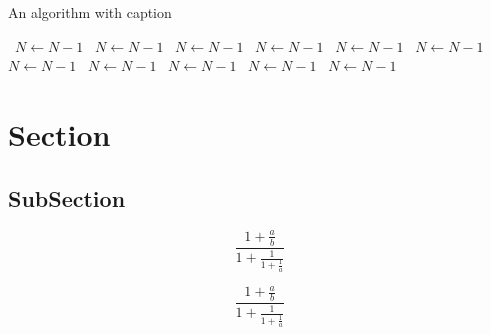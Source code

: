 \documentclass[a4paper]{article}
\begin{document}
\begin{algorithm}
\caption{An algorithm with caption}
\begin{algorithmic}
\    \State $N \gets N - 1$
\    \State $N \gets N - 1$
\    \State $N \gets N - 1$
\    \State $N \gets N - 1$
\    \State $N \gets N - 1$
\    \State $N \gets N - 1$
\    \State $N \gets N - 1$
\    \State $N \gets N - 1$
\    \State $N \gets N - 1$
\    \State $N \gets N - 1$
\    \State $N \gets N - 1$
\EndWhile
\end{algorithmic}
\end{algorithm}

\section{Section}

\subsection{SubSection}

\[ \frac{1+\frac{a}{b}}{1+\frac{1}{1+\frac{1}{a}}} \]

\[ \frac{1+\frac{a}{b}}{1+\frac{1}{1+\frac{1}{a}}} \]
\end{document}
